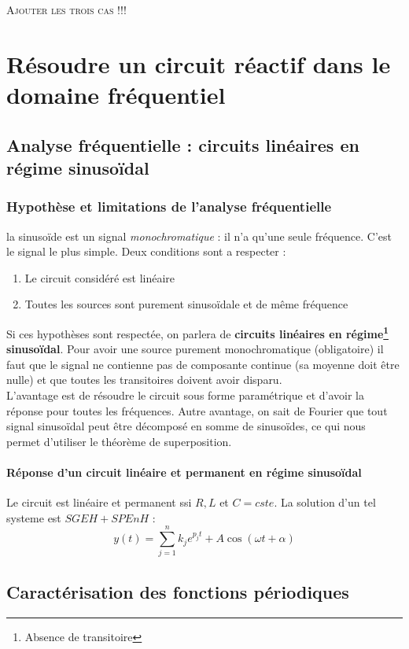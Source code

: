 \documentclass	[11pt, a4paper, openany]{book}
\begin{document}
\textsc{Ajouter les trois cas !!!}

\chapter{Résoudre un circuit réactif dans le domaine fréquentiel}
\section{Analyse fréquentielle : circuits linéaires en régime sinusoïdal}
\subsection{Hypothèse et limitations de l'analyse fréquentielle}
la sinusoïde est un signal \textit{monochromatique} : il n'a qu'une seule fréquence. C'est le signal le plus simple. Deux conditions sont a respecter :
\begin{enumerate}
\item Le circuit considéré est linéaire
\item Toutes les sources sont purement sinusoïdale et de même fréquence
\end{enumerate}
Si ces hypothèses sont respectée, on parlera de \textbf{circuits linéaires en régime\footnote{Absence de transitoire} sinusoïdal}. Pour avoir une source purement monochromatique (obligatoire) il faut que le signal ne contienne pas de composante continue (sa moyenne doit être nulle) et que toutes les transitoires doivent avoir disparu.\\

L'avantage est de résoudre le circuit sous forme paramétrique et d'avoir la réponse pour toutes les fréquences. Autre avantage, on sait de Fourier que tout signal sinusoïdal peut être décomposé en somme de sinusoïdes, ce qui nous permet d'utiliser le théorème de superposition.

\subsubsection{Réponse d'un circuit linéaire et permanent en régime sinusoïdal}
Le circuit est linéaire et permanent ssi $R, L$ et $C = cste$. La solution d'un tel systeme est $SGEH + SPEnH$ :
\begin{equation}
y(t) = \sum_{j=1}^n k_j e^{p_jt} + A\cos(\omega t + \alpha)
\end{equation}

\section{Caractérisation des fonctions périodiques}
\end{document}
